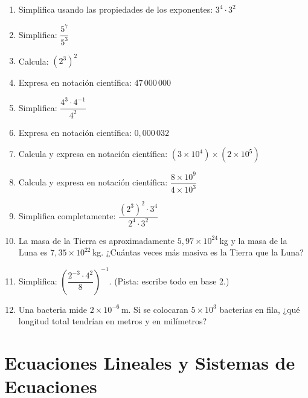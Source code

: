 \documentclass[12pt, letterpaper]{article}
\begin{document}
\begin{enumerate}[leftmargin=*, resume]
  \item \facil{} Simplifica usando las propiedades de los exponentes: $3^4 \cdot 3^2$

  \item \facil{} Simplifica: $\dfrac{5^7}{5^3}$

  \item \facil{} Calcula: $(2^3)^2$

  \item \facil{} Expresa en notación científica: $47\,000\,000$

  \item \medio{} Simplifica: $\dfrac{4^3 \cdot 4^{-1}}{4^2}$

  \item \medio{} Expresa en notación científica: $0{,}000\,032$

  \item \medio{} Calcula y expresa en notación científica: $(3 \times 10^4) \times (2 \times 10^5)$

  \item \medio{} Calcula y expresa en notación científica: $\dfrac{8 \times 10^9}{4 \times 10^3}$

  \item \medio{} Simplifica completamente: $\dfrac{(2^3)^2 \cdot 3^4}{2^4 \cdot 3^2}$

  \item \dificil{} La masa de la Tierra es aproximadamente $5{,}97 \times 10^{24}$\,kg y la masa de la Luna es $7{,}35 \times 10^{22}$\,kg. ¿Cuántas veces más masiva es la Tierra que la Luna?

  \item \dificil{} Simplifica: $\left(\dfrac{2^{-3} \cdot 4^2}{8}\right)^{-1}$. (Pista: escribe todo en base 2.)

  \item \dificil{} Una bacteria mide $2 \times 10^{-6}$\,m. Si se colocaran $5 \times 10^3$ bacterias en fila, ¿qué longitud total tendrían en metros y en milímetros?
\end{enumerate}


\section{Ecuaciones Lineales y Sistemas de Ecuaciones}
\end{document}
